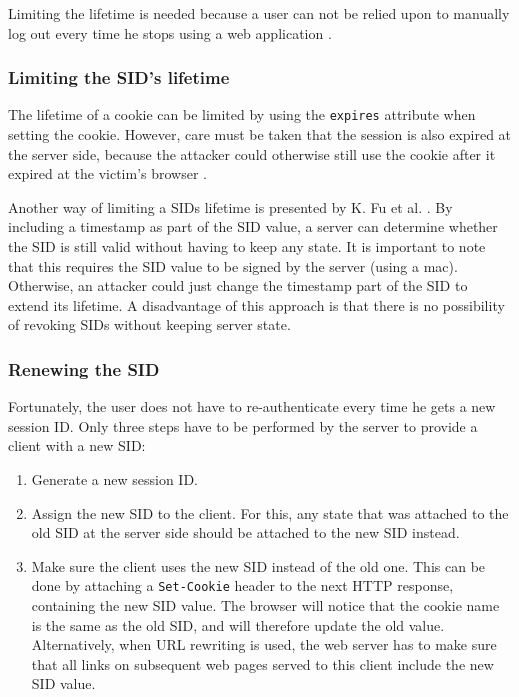 Limiting the lifetime is needed because a user can not be relied upon to manually log out every time he stops using a web application \cite{OWASP2009a}. %

\subsubsection{Limiting the SID's lifetime}
The lifetime of a cookie can be limited by using the \texttt{expires} attribute when setting the cookie. However, care must be taken that the session is also expired at the server side, because the attacker could otherwise still use the cookie after it expired at the victim's browser \cite{Kolsek2002}.

Another way of limiting a SIDs lifetime is presented by K. Fu et al. \cite{Fu2001}. By including a timestamp as part of the SID value, a server can determine whether the SID is still valid without having to keep any state. It is important to note that this requires the SID value to be signed by the server (using a \gls{mac}). Otherwise, an attacker could just change the timestamp part of the SID to extend its lifetime. A disadvantage of this approach is that there is no possibility of revoking SIDs without keeping server state.

\subsubsection{Renewing the SID}
Fortunately, the user does not have to re-authenticate every time he gets a new session ID. Only three steps have to be performed by the server to provide a client with a new SID:
\begin{enumerate}
	\item Generate a new session ID.
	\item Assign the new SID to the client. For this, any state that was attached to the old SID at the server side should be attached to the new SID instead.
	\item Make sure the client uses the new SID instead of the old one. This can be done by attaching a \texttt{Set-Cookie} header to the next HTTP response, containing the new SID value. The browser will notice that the cookie name is the same as the old SID, and will therefore update the old value. Alternatively, when URL rewriting is used, the web server has to make sure that all links on subsequent web pages served to this client include the new SID value.
\end{enumerate}

